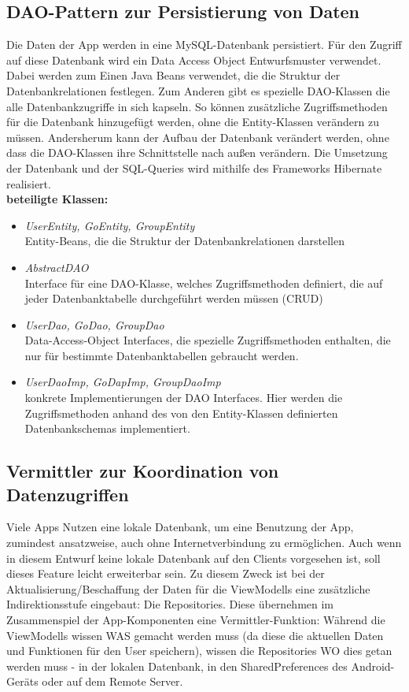 \documentclass[11pt,a4paper]{article}
\begin{document}
\subsection{DAO-Pattern zur Persistierung von Daten}
Die Daten der App werden in eine MySQL-Datenbank persistiert. Für den Zugriff auf diese Datenbank wird ein Data Access Object Entwurfsmuster verwendet. Dabei werden zum Einen Java Beans verwendet, die die Struktur der Datenbankrelationen festlegen. Zum Anderen gibt es spezielle DAO-Klassen die alle Datenbankzugriffe in sich kapseln. So können zusätzliche Zugriffsmethoden für die Datenbank hinzugefügt werden, ohne die Entity-Klassen verändern zu müssen. Andersherum kann der Aufbau der Datenbank verändert werden, ohne dass die DAO-Klassen ihre Schnittstelle nach außen verändern.
Die Umsetzung der Datenbank und der SQL-Queries wird mithilfe des Frameworks Hibernate realisiert.\\

\textbf{beteiligte Klassen:}
\begin{itemize}
	\item \textit{UserEntity, GoEntity, GroupEntity}\\ Entity-Beans, die die Struktur der Datenbankrelationen darstellen
	\item \textit{AbstractDAO}\\ Interface für eine DAO-Klasse, welches Zugriffsmethoden definiert, die auf jeder Datenbanktabelle durchgeführt werden müssen (CRUD)
	\item \textit{UserDao, GoDao, GroupDao}\\ Data-Access-Object Interfaces, die spezielle Zugriffsmethoden enthalten, die nur für bestimmte Datenbanktabellen gebraucht werden.
	\item \textit{UserDaoImp, GoDapImp, GroupDaoImp}\\ konkrete Implementierungen der DAO Interfaces. Hier werden die Zugriffsmethoden anhand des von den Entity-Klassen definierten Datenbankschemas
	implementiert.
\end{itemize}

\newpage

\subsection{Vermittler zur Koordination von Datenzugriffen}\label{Vermittler}
Viele Apps Nutzen eine lokale Datenbank, um eine Benutzung der App, zumindest ansatzweise, auch ohne Internetverbindung zu ermöglichen. Auch wenn in diesem Entwurf keine lokale Datenbank auf den Clients vorgesehen ist, soll dieses Feature leicht erweiterbar sein. Zu diesem Zweck ist bei der Aktualisierung/Beschaffung der Daten für die ViewModells eine zusätzliche Indirektionsstufe eingebaut: Die Repositories. Diese übernehmen im Zusammenspiel der App-Komponenten eine Vermittler-Funktion: Während die ViewModells wissen WAS gemacht werden muss (da diese die aktuellen Daten und Funktionen für den User speichern), wissen die Repositories WO dies getan werden muss - in der lokalen Datenbank, in den SharedPreferences des Android-Geräts oder auf dem Remote Server.\\
\end{document}
